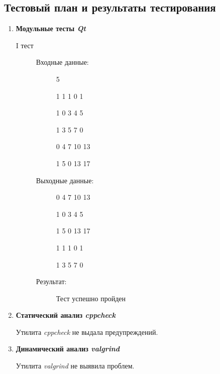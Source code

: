 \documentclass[12pt,a4paper]{report}
\begin{document}
\subsection{Тестовый план и результаты тестирования}
\hspace{\parindent}
\begin{enumerate}
\item \textbf{Модульные тесты \textit{Qt}}

\begin{description}
\item[I тест]
\hspace{\parindent}
\begin{flushleft}
\begin{description}
\item[Входные данные:]

\hspace{\parindent}
\begin{flushleft}
5

1 1 1 0 1

1 0 3 4 5

1 3 5 7 0

0 4 7 10 13

1 5 0 13 17
\end{flushleft}

\item[Выходные данные:]
\hspace{\parindent}
\begin{flushleft}
0 4 7 10 13

1 0 3 4 5

1 5 0 13 17

1 1 1 0 1

1 3 5 7 0
\end{flushleft}
\item[Результат:] Тест успешно пройден
\end{description}
\end{flushleft}
\end{description}

\item \textbf{Статический анализ \textit{cppcheck}}

Утилита \textit{cppcheck} не выдала предупреждений.

\item \textbf{Динамический анализ \textit{valgrind}}

Утилита \textit{valgrind} не выявила проблем.
\end{enumerate}
\end{document}
